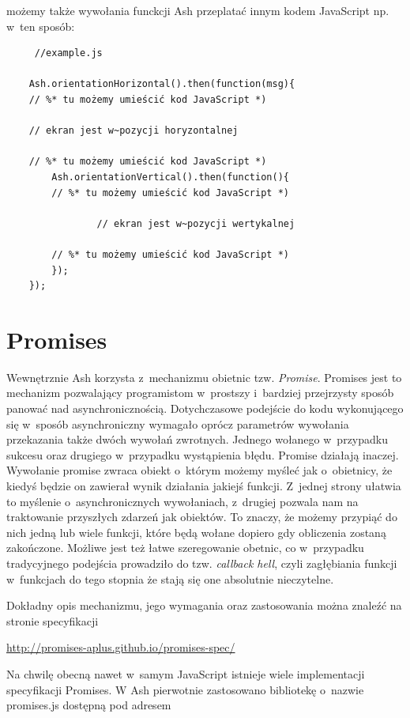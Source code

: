 \documentclass[brudnopis]{xmgr}
\begin{document}
możemy także wywołania funckcji Ash przeplatać innym kodem JavaScript np. w~ten sposób:

\begin{lstlisting}
     //example.js

    Ash.orientationHorizontal().then(function(msg){
	// %* tu możemy umieścić kod JavaScript *)
      	
	// ekran jest w~pozycji horyzontalnej
      
	// %* tu możemy umieścić kod JavaScript *)
      	Ash.orientationVertical().then(function(){
		// %* tu możemy umieścić kod JavaScript *)

        		// ekran jest w~pozycji wertykalnej 

		// %* tu możemy umieścić kod JavaScript *)
      	});
    });
\end{lstlisting}

\section{Promises}

Wewnętrznie Ash korzysta z~mechanizmu obietnic tzw. \textit{Promise}. Promises jest to mechanizm pozwalający programistom w~prostszy i~bardziej przejrzysty sposób panować nad asynchronicznością. Dotychczasowe podejście do kodu wykonującego się w~sposób asynchroniczny wymagało oprócz parametrów wywołania przekazania także dwóch wywołań zwrotnych. Jednego wołanego w~przypadku sukcesu oraz drugiego w~przypadku wystąpienia błędu. Promise działają inaczej. Wywołanie promise zwraca obiekt o~którym możemy myśleć jak o~obietnicy, że kiedyś będzie on zawierał wynik działania jakiejś funkcji. Z~jednej strony ułatwia to myślenie o~asynchronicznych wywołaniach, z~drugiej pozwala nam na traktowanie przyszłych zdarzeń jak obiektów. To znaczy, że możemy przypiąć do nich jedną lub wiele funkcji, które będą wołane dopiero gdy obliczenia zostaną zakończone. Możliwe jest też łatwe szeregowanie obetnic, co w~przypadku tradycyjnego podejścia prowadziło do tzw. \textit{callback hell}, czyli zagłębiania funkcji w~funkcjach do tego stopnia że stają się one absolutnie nieczytelne. 

Dokładny opis mechanizmu, jego wymagania oraz zastosowania można znaleźć na  stronie specyfikacji

\url{http://promises-aplus.github.io/promises-spec/}

Na chwilę obecną nawet w~samym JavaScript istnieje wiele implementacji specyfikacji Promises. W Ash pierwotnie zastosowano bibliotekę o~nazwie promises.js dostępną pod adresem
\end{document}
